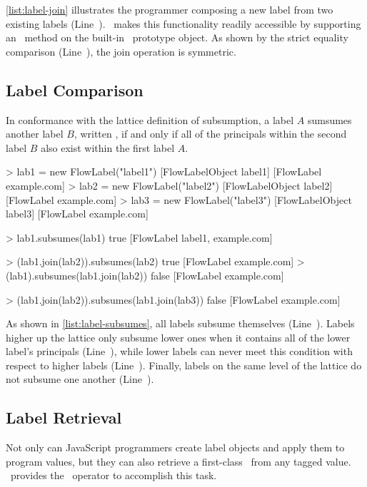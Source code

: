 \autoref{list:label-join} illustrates the programmer composing a new label from two existing labels (Line~).
\JitFlow\ makes this functionality readily accessible by supporting an \mjoin\ method on the built-in \FlowLabel\ prototype object.
As shown by the strict equality comparison (Line~), the join operation is symmetric.

\subsection{Label Comparison}

In conformance with the lattice definition of subsumption, a label $A$ sumsumes another label $B$, written , if and only if all of the principals within the second label $B$ also exist within the first label $A$.

\begin{jscode}
> lab1 = new FlowLabel("label1")
  [FlowLabelObject label1] [FlowLabel example.com]
> lab2 = new FlowLabel("label2")
  [FlowLabelObject label2] [FlowLabel example.com]
> lab3 = new FlowLabel("label3")
  [FlowLabelObject label3] [FlowLabel example.com]

> lab1.subsumes(lab1)
  true [FlowLabel label1, example.com]

> (lab1.join(lab2)).subsumes(lab2)
  true [FlowLabel example.com]
> (lab1).subsumes(lab1.join(lab2))
  false [FlowLabel example.com]

> (lab1.join(lab2)).subsumes(lab1.join(lab3))
  false [FlowLabel example.com]
\end{jscode}

As shown in \autoref{list:label-subsumes}, all labels subsume themselves (Line~).
Labels higher up the lattice only subsume lower ones when it contains all of the lower label's principals (Line~), while lower labels can never meet this condition with respect to higher labels (Line~).
Finally, labels on the same level of the lattice do not subsume one another (Line~).

\subsection{Label Retrieval}

Not only can JavaScript programmers create label objects and apply them to program values, but they can also retrieve a first-class \FlowLabelObject\ from any tagged value.
\JitFlow\ provides the \mlabelof\ operator to accomplish this task.

